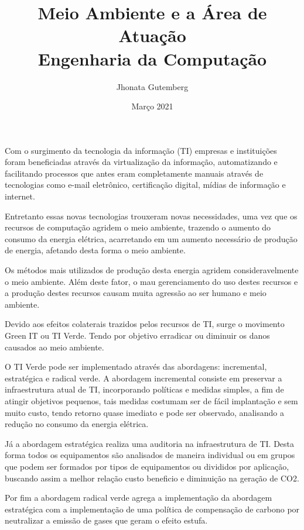 \documentclass[a4paper, 12pt]{article}
\title{
    Meio Ambiente e a Área de Atuação \\
    \large Engenharia da Computação
}
\author{
    Jhonata Gutemberg
}
\date{Março 2021}
\begin{document}
    \maketitle

    \par Com o surgimento da tecnologia da informação (TI) empresas e
    instituições foram beneficiadas através da virtualização da informação,
    automatizando e facilitando processos que antes eram completamente 
    manuais através de tecnologias como e-mail eletrônico, certificação
    digital, mídias de informação e internet.
    
    \par Entretanto essas novas tecnologias trouxeram novas necessidades,
    uma vez que os recursos de computação agridem o meio ambiente, trazendo o aumento do consumo da energia elétrica, acarretando
    em um aumento necessário de produção de energia, afetando desta forma o meio ambiente. 
    
    \par Os métodos mais utilizados de produção desta energia agridem consideravelmente o meio ambiente. Além deste fator, o mau gerenciamento do uso destes recursos e a produção destes recursos causam muita agressão ao ser humano e meio ambiente.
    
    \par Devido aos efeitos colaterais trazidos pelos recursos de TI, 
    surge o movimento Green IT ou TI Verde. Tendo por objetivo erradicar
    ou diminuir os danos causados ao meio ambiente.
    
    \par O TI Verde pode ser implementado através das abordagens: 
    incremental, estratégica e radical verde. A abordagem incremental
    consiste em preservar a infraestrutura atual de TI, incorporando 
    políticas e medidas simples, a fim de atingir objetivos pequenos, 
    tais medidas costumam ser de fácil implantação e sem muito custo,
    tendo retorno quase imediato e pode ser observado, analisando a redução
    no consumo da energia elétrica. 
    
    \par Já a abordagem estratégica realiza uma auditoria na infraestrutura de TI. Desta forma todos os equipamentos são analisados de maneira individual ou em grupos que podem ser formados por tipos de equipamentos ou divididos por aplicação, buscando assim a melhor relação custo beneficio e diminuição na geração de CO2.
    
    \par Por fim a abordagem radical verde agrega a implementação da abordagem estratégica com a implementação de uma política de compensação de carbono por neutralizar a emissão de gases que geram o efeito estufa.
\end{document}
